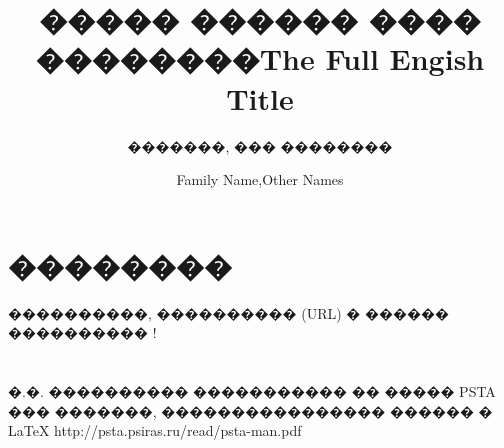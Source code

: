 \documentclass[koi8-r]{psta}%
\title[������]{����� ������ ���� ��������}
\author{�������, ��� ��������}
\title[Short title]{The Full Engish Title}
\author{Family Name,Other Names}
\begin{document}
           
\maketitle   
\section*{��������}
����������, ���������� (URL) � ������ ���������� \cite{PSTAmanual}!%
\section{}
\subsection{}


% 
\begin{thebibliography}{30}
%
%
%
\by �.�. ����������
\preprint ����������� �� ����� PSTA ��� �������, ���������������� ������ � \LaTeX
{} 
\URL http://psta.psiras.ru/read/psta-man.pdf

\end{thebibliography}
\end{document}
